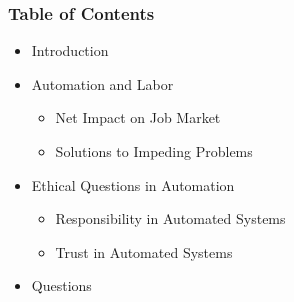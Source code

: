 



\begin{frame}
  \frametitle{ Table of Contents}
  \begin{itemize}
  \item Introduction
  \item Automation and Labor
    \begin{itemize}
    \item Net Impact on Job Market
    \item Solutions to Impeding Problems
    \end{itemize}
  \item Ethical Questions in Automation
    \begin{itemize}
    \item Responsibility in Automated Systems
    \item Trust in Automated Systems
    \end{itemize}
  \item Questions
  \end{itemize}
\end{frame}


